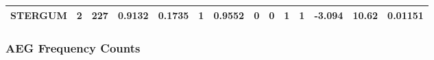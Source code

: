 \begin{longtable}[]{@{}cccccccccccccc@{}}
\begin{minipage}[t]{0.07\columnwidth}
\textbf{STERGUM}\strut
\end{minipage} & \begin{minipage}[t]{0.04\columnwidth}\centering\strut
2\strut
\end{minipage} & \begin{minipage}[t]{0.03\columnwidth}\centering\strut
227\strut
\end{minipage} & \begin{minipage}[t]{0.05\columnwidth}\centering\strut
0.9132\strut
\end{minipage} & \begin{minipage}[t]{0.05\columnwidth}\centering\strut
0.1735\strut
\end{minipage} & \begin{minipage}[t]{0.05\columnwidth}\centering\strut
1\strut
\end{minipage} & \begin{minipage}[t]{0.05\columnwidth}\centering\strut
0.9552\strut
\end{minipage} & \begin{minipage}[t]{0.05\columnwidth}\centering\strut
0\strut
\end{minipage} & \begin{minipage}[t]{0.03\columnwidth}\centering\strut
0\strut
\end{minipage} & \begin{minipage}[t]{0.03\columnwidth}\centering\strut
1\strut
\end{minipage} & \begin{minipage}[t]{0.04\columnwidth}\centering\strut
1\strut
\end{minipage} & \begin{minipage}[t]{0.05\columnwidth}\centering\strut
-3.094\strut
\end{minipage} & \begin{minipage}[t]{0.06\columnwidth}\centering\strut
10.62\strut
\end{minipage} & \begin{minipage}[t]{0.06\columnwidth}\centering\strut
0.01151\strut
\end{minipage}\tabularnewline
\bottomrule
\end{longtable}

\subsubsection{AEG Frequency Counts}\label{aeg-frequency-counts}

\begin{Shaded}
\begin{Highlighting}[]
\NormalTok{(} \NormalTok{, } \NormalTok{)}
\end{Highlighting}
\end{Shaded}

